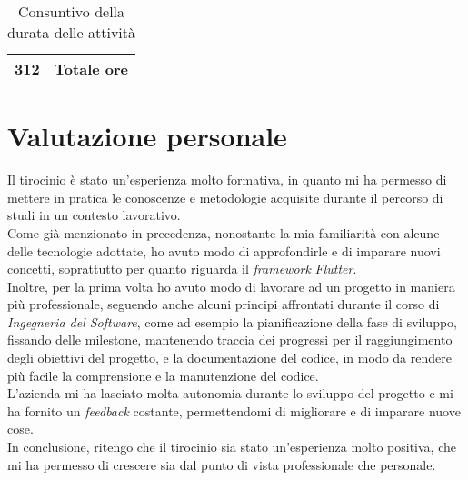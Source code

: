 \begin{table}
\begin{tabularx}{\textwidth}{|c|c|X|}
        \textbf{312} & \multicolumn{2}{|c|}{\textbf{Totale ore}} \\ 
        \hline
        
    \end{tabularx}
    \caption{Consuntivo della durata delle attività}
    \label{tab:consultivo-ore}
\end{table}

\section{Valutazione personale}
\label{sec:valutazione-personale}

Il tirocinio è stato un'esperienza molto formativa, in quanto mi ha permesso di mettere in pratica le conoscenze e metodologie acquisite durante il percorso di studi in un contesto lavorativo.\\
Come già menzionato in precedenza, nonostante la mia familiarità con alcune delle tecnologie adottate, ho avuto modo di approfondirle e di imparare nuovi concetti, soprattutto per quanto riguarda il \emph{framework} \emph{Flutter}.\\
Inoltre, per la prima volta ho avuto modo di lavorare ad un progetto in maniera più professionale, seguendo anche alcuni principi affrontati durante il corso di \emph{Ingegneria del Software}, come ad esempio la pianificazione della fase di sviluppo, fissando delle \gls{milestone}\glsoccur, mantenendo traccia dei progressi per il raggiungimento degli obiettivi del progetto, e la documentazione del codice, in modo da rendere più facile la comprensione e la manutenzione del codice.\\  
L'azienda mi ha lasciato molta autonomia durante lo sviluppo del progetto e mi ha fornito un \emph{feedback} costante, permettendomi di migliorare e di imparare nuove cose. \\
In conclusione, ritengo che il tirocinio sia stato un'esperienza molto positiva, che mi ha permesso di crescere sia dal punto di vista professionale che personale. 